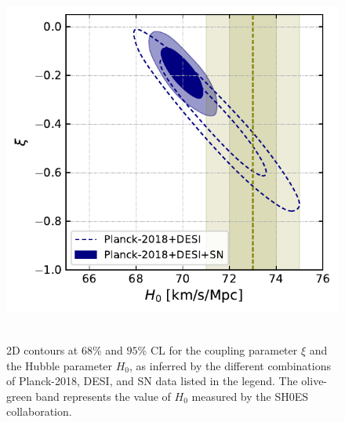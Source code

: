 \documentclass[superscriptaddress,twocolumn,showpacs,a4paper,
amssymb,amsmath,nobibnotes,aps,prl,
showkeys,
nofootinbib,notitlepage]{revtex4-1}
\begin{document}
\begin{figure}[htpb!]
    \centering
    \includegraphics[width=\columnwidth]{Figure1.pdf} \,\,\,
    \caption{2D contours at $68\%$ and $95\%$ CL for the coupling parameter $\xi$ and the Hubble parameter $H_0$, as inferred by the different combinations of Planck-2018, DESI, and SN data listed in the legend. The olive-green band represents the value of $H_0$ measured by the SH0ES collaboration.}
    \label{fig:H0}
\end{figure}
\end{document}
